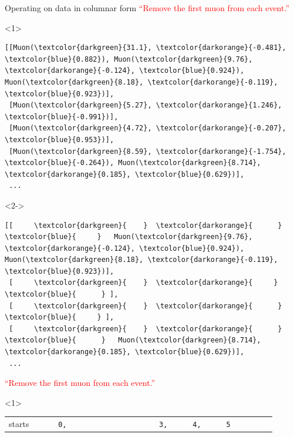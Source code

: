 \documentclass[aspectratio=169]{beamer}
\begin{document}
\begin{frame}[fragile]{Operating on data in columnar form}
\vspace{0.5 cm}
\textcolor{red}{``Remove the first muon from each event.''} 
\scriptsize
\begin{onlyenv}<1>
\begin{Verbatim}[commandchars=\\\{\}]
[[Muon(\textcolor{darkgreen}{31.1}, \textcolor{darkorange}{-0.481}, \textcolor{blue}{0.882}), Muon(\textcolor{darkgreen}{9.76}, \textcolor{darkorange}{-0.124}, \textcolor{blue}{0.924}), Muon(\textcolor{darkgreen}{8.18}, \textcolor{darkorange}{-0.119}, \textcolor{blue}{0.923})],
 [Muon(\textcolor{darkgreen}{5.27}, \textcolor{darkorange}{1.246}, \textcolor{blue}{-0.991})],
 [Muon(\textcolor{darkgreen}{4.72}, \textcolor{darkorange}{-0.207}, \textcolor{blue}{0.953})],
 [Muon(\textcolor{darkgreen}{8.59}, \textcolor{darkorange}{-1.754}, \textcolor{blue}{-0.264}), Muon(\textcolor{darkgreen}{8.714}, \textcolor{darkorange}{0.185}, \textcolor{blue}{0.629})],
 ...
\end{Verbatim}
\end{onlyenv}\begin{onlyenv}<2->
\begin{Verbatim}[commandchars=\\\{\}]
[[     \textcolor{darkgreen}{    }  \textcolor{darkorange}{      }  \textcolor{blue}{     }   Muon(\textcolor{darkgreen}{9.76}, \textcolor{darkorange}{-0.124}, \textcolor{blue}{0.924}), Muon(\textcolor{darkgreen}{8.18}, \textcolor{darkorange}{-0.119}, \textcolor{blue}{0.923})],
 [     \textcolor{darkgreen}{    }  \textcolor{darkorange}{     }  \textcolor{blue}{      } ],
 [     \textcolor{darkgreen}{    }  \textcolor{darkorange}{      }  \textcolor{blue}{     } ],
 [     \textcolor{darkgreen}{    }  \textcolor{darkorange}{      }  \textcolor{blue}{      }   Muon(\textcolor{darkgreen}{8.714}, \textcolor{darkorange}{0.185}, \textcolor{blue}{0.629})],
 ...
\end{Verbatim}
\end{onlyenv}
\normalsize
\vspace{0.5 cm}
\textcolor{red}{``Remove the first muon from each event.''} 
\vspace{0.25 cm}
\begin{onlyenv}<1>
\begin{tabular}{r l}
\small starts  &                    {\tt\scriptsize \ \ \ \ \ 0,\ \ \ \ \ \ \ \ \ \ \ \ \ \ \ \ \ \ \ \ \ \ 3,\ \ \ \ \ \ 4,\ \ \ \ \ \ 5\ \ \ \ \ \ \ \ \ } \\

\end{tabular}
\end{onlyenv}
\end{frame}
\end{document}

